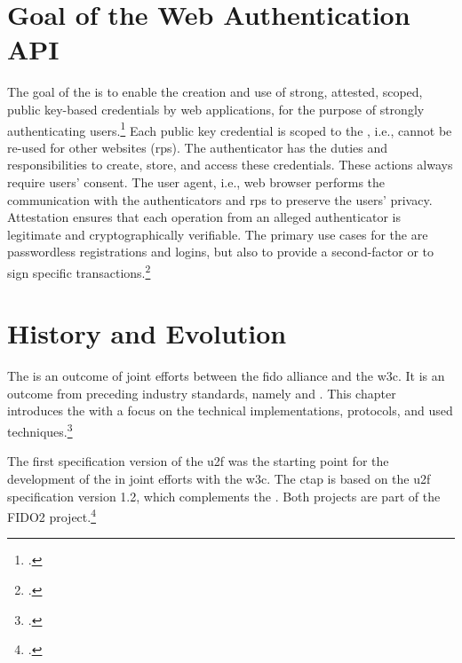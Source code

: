 \section{Goal of the Web Authentication API}

The goal of the \wa{} is to enable \frqq the creation and use of strong, attested, scoped, public key-based credentials by web applications, for the purpose of strongly authenticating users\flqq.\footcites[See][Abstract]{w3c} Each public key credential is scoped to the , i.e., cannot be re-used for other websites (\glspl{rp}). The authenticator has the duties and responsibilities to create, store, and access these credentials. These actions always require users' consent. The user agent, i.e., web browser performs the communication with the authenticators and \glspl{rp} to preserve the users' privacy. Attestation ensures that each operation from an alleged authenticator is legitimate and cryptographically verifiable. The primary use cases for the \wa{} are passwordless registrations and logins, but also to provide a second-factor or to sign specific transactions.\footcites[See][Abstract, Chapter 1.2]{w3c}

\section{History and Evolution}

The \wa{} is an outcome of joint efforts between	 the \gls{fido} alliance and the \gls{w3c}. It is an outcome from preceding industry standards, namely  and . This chapter introduces the \wa{} with a focus on the technical implementations, protocols, and used techniques.\footcites[See][24]{fido-ct-3}

The first specification version of the \gls{u2f} was the starting point for the development of the \wa{} in joint efforts with the \gls{w3c}. The \gls{ctap} is based on the \gls{u2f} specification version 1.2, which complements the \wa. Both projects are part of the FIDO2 project.\footcite[See][169--170]{grimes2017hacking}
